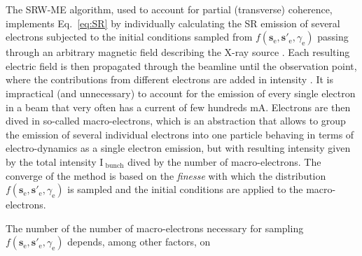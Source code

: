 \documentclass{iucr}              %
\begin{document}
The SRW-ME algorithm, used to account for partial (transverse) coherence, implements Eq.~\ref{eq:SR} by individually calculating the SR emission of several electrons subjected to the initial conditions sampled from $f(\textbf{s}_\text{e}, \textbf{s}'_\text{e}, \gamma_\text{e})$ passing through an arbitrary magnetic field describing the X-ray source \cite{Chubar1995}. Each resulting electric field is then propagated through the beamline until the observation point, where the contributions from different electrons are added in intensity \cite{codeSRW_ME}. It is impractical (and unnecessary) to account for the emission of every single electron in a beam that very often has a current of few hundreds mA. Electrons are then dived in so-called macro-electrons, which is an abstraction that allows to group the emission of several individual electrons into one particle behaving in terms of electro-dynamics as a single electron emission, but with resulting intensity given by the total intensity $\text{I}_\text{~bunch}$ dived by the number of macro-electrons. The converge of the method is based on the \textit{finesse} with which the distribution $f(\textbf{s}_\text{e}, \textbf{s}'_\text{e}, \gamma_\text{e})$ is sampled and the initial conditions are applied to the macro-electrons.

The number of the number of macro-electrons necessary for sampling $f(\textbf{s}_\text{e}, \textbf{s}'_\text{e}, \gamma_\text{e})$ depends, among other factors, on 







\end{document}
